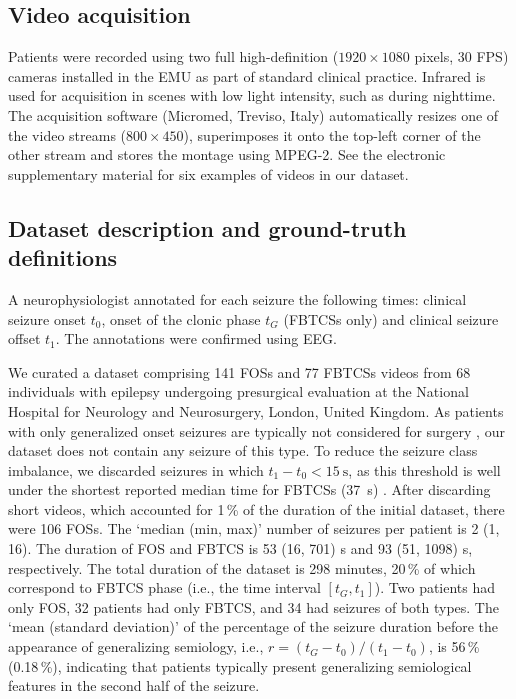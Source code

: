 \subsection{Video acquisition}

Patients were recorded using two full high-definition ($1920 \times 1080$ pixels, 30 \ac{FPS}) cameras installed in the \ac{EMU} as part of standard clinical practice.
Infrared is used for acquisition in scenes with low light intensity, such as during nighttime.
The acquisition software (Micromed, Treviso, Italy) automatically resizes one of the video streams ($800 \times 450$), superimposes it onto the top-left corner of the other stream and stores the montage using MPEG-2.
See the electronic supplementary material%
for six examples of videos in our dataset.


\subsection{Dataset description and ground-truth definitions}
\label{sec:dataset}

A neurophysiologist annotated for each seizure the following times: clinical seizure onset $t_0$, onset of the clonic phase $t_G$ (\acp{FBTCS} only) and clinical seizure offset $t_1$.
The annotations were confirmed using \ac{EEG}.

We curated a dataset comprising 141 \acp{FOS} and 77 \acp{FBTCS} videos from 68 individuals with epilepsy undergoing presurgical evaluation at the National Hospital for Neurology and Neurosurgery, London, United Kingdom.
As patients with only generalized onset seizures are typically not considered for surgery \cite{duncan_brain_2016}, our dataset does not contain any seizure of this type.  %
To reduce the seizure class imbalance, we discarded seizures in which $t_1 - t_0 < \SI{15}{\second}$, as this threshold is well under the shortest reported median time for \acp{FBTCS} (\SI{37}{\second}) \cite{jenssen_how_2006}.
After discarding short videos, which accounted for 1\,\% of the duration of the initial dataset, there were 106 \acp{FOS}.
The `median (min, max)' number of seizures per patient is 2 (1, 16).
The duration of \ac{FOS} and \ac{FBTCS} is 53 (16, 701) s and 93 (51, 1098) s, respectively.
The total duration of the dataset is 298 minutes, 20\,\% of which correspond to \ac{FBTCS} phase (i.e., the time interval $[t_G, t_1]$).
Two patients had only \ac{FOS}, 32 patients had only \ac{FBTCS}, and 34 had seizures of both types.
The `mean (standard deviation)' of the percentage of the seizure duration before the appearance of generalizing semiology, i.e., $r = (t_G - t_0) / (t_1 - t_0)$, is 56\,\% (0.18\,\%), indicating that patients typically present generalizing semiological features in the second half of the seizure.

